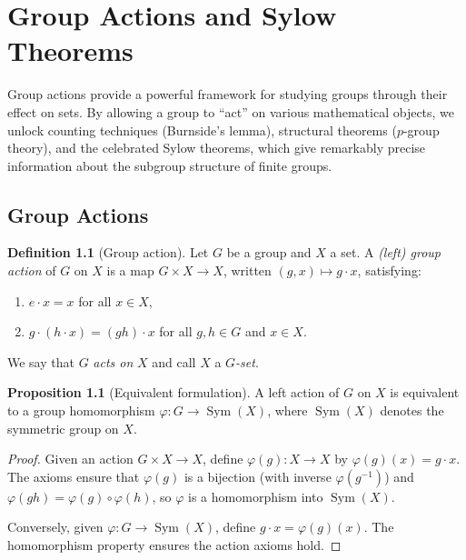 \documentclass[12pt,a4paper,openany]{book}
\theoremstyle{definition}
\newtheorem{definition}{Definition}[chapter]
\newtheorem{proposition}{Proposition}[chapter]
\theoremstyle{remark}
\DeclareMathOperator{\Sym}{Sym}
\begin{document}
\chapter{Group Actions and Sylow Theorems}\label{ch:group-actions}

Group actions provide a powerful framework for studying groups through
their effect on sets.  By allowing a group to ``act'' on various
mathematical objects, we unlock counting techniques (Burnside's lemma),
structural theorems ($p$-group theory), and the celebrated Sylow
theorems, which give remarkably precise information about the subgroup
structure of finite groups.

\section{Group Actions}\label{sec:group-action-def}

\begin{definition}[Group action]\label{def:group-action}
Let $G$ be a group and $X$ a set.  A \emph{(left) group action} of $G$
on $X$ is a map $G\times X\to X$, written $(g,x)\mapsto g\cdot x$,
satisfying:
\begin{enumerate}
\item $e\cdot x = x$ for all $x\in X$,
\item $g\cdot(h\cdot x) = (gh)\cdot x$ for all $g,h\in G$ and $x\in X$.
\end{enumerate}
We say that $G$ \emph{acts on} $X$ and call $X$ a \emph{$G$-set}.
\end{definition}

\begin{proposition}[Equivalent formulation]\label{prop:action-hom}
A left action of $G$ on $X$ is equivalent to a group homomorphism
$\varphi\colon G\to\Sym(X)$, where $\Sym(X)$ denotes the symmetric
group on $X$.
\end{proposition}

\begin{proof}
Given an action $G\times X\to X$, define $\varphi(g)\colon X\to X$
by $\varphi(g)(x)=g\cdot x$.  The axioms ensure that $\varphi(g)$
is a bijection (with inverse $\varphi(g^{-1})$) and
$\varphi(gh)=\varphi(g)\circ\varphi(h)$, so $\varphi$ is a
homomorphism into $\Sym(X)$.

Conversely, given $\varphi\colon G\to\Sym(X)$, define
$g\cdot x = \varphi(g)(x)$.  The homomorphism property ensures the
action axioms hold.
\end{proof}
\end{document}
